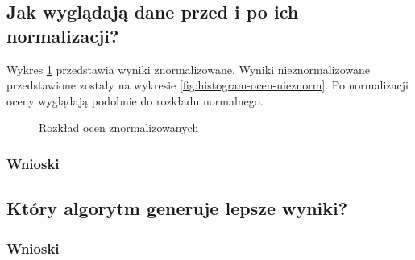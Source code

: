 \documentclass[12pt, a4paper]{article}
\begin{document}
\subsection{Jak wyglądają dane przed i po ich normalizacji?}
Wykres \ref{fig:histogram-ocen-norm} przedstawia wyniki znormalizowane. Wyniki nieznormalizowane przedstawione zostały na wykresie \ref{fig:histogram-ocen-nieznorm}. Po normalizacji oceny wyglądają podobnie do rozkładu normalnego.
\begin{figure}[H]
  \begin{center}
  \end{center}
  \caption{Rozkład ocen znormalizowanych}
  \label{fig:histogram-ocen-norm}
\end{figure}

\subsubsection{Wnioski}

\subsection{Który algorytm generuje lepsze wyniki?}

\subsubsection{Wnioski}
\end{document}
